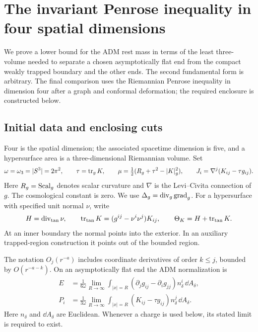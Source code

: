 \section{The invariant Penrose inequality in four spatial dimensions}
\label{four:sec:introduction}

We prove a lower bound for the ADM rest mass in terms of the least
three-volume needed to separate a chosen asymptotically flat end from
the compact weakly trapped boundary and the other ends. The second
fundamental form is arbitrary. The final comparison uses the
Riemannian Penrose inequality in dimension four after a graph and
conformal deformation; the required enclosure is constructed below.

\subsection{Initial data and enclosing cuts}

Four is the spatial dimension; the associated spacetime dimension is
five, and a hypersurface area is a three-dimensional Riemannian volume.
Set
\[
 \omega=\omega_3=|S^3|=2\pi^2,\qquad
 \tau=\operatorname{tr}_gK,\qquad
 \mu=\tfrac12(R_g+\tau^2-|K|_g^2),\qquad
 J_i=\nabla^j(K_{ij}-\tau g_{ij}).
\]
Here $R_g=\operatorname{Scal}_g$ denotes scalar curvature and $\nabla$ is the
Levi--Civita connection of $g$. The cosmological constant is zero. We use
\(\Delta_g=\operatorname{div}_g\operatorname{grad}_g\).
For a hypersurface with specified unit normal \(\nu\), write
\[
 H=\operatorname{div}_{\mathrm{tan}}\nu,\qquad
 \operatorname{tr}_{\mathrm{tan}}K=(g^{ij}-\nu^i\nu^j)K_{ij},\qquad
 \Theta_K=H+\operatorname{tr}_{\mathrm{tan}}K.
\]
At an inner boundary the normal points into the exterior. In an auxiliary
trapped-region construction it points out of the bounded region.

The notation \(O_j(r^{-a})\) includes coordinate derivatives of order
\(k\le j\), bounded by \(O(r^{-a-k})\). On an asymptotically flat end the
ADM normalization is
\begin{align}
 E&=\frac{1}{6\omega}\lim_{R\to\infty}
       \int_{|x|=R}(\partial_jg_{ij}-\partial_i g_{jj})
                    n_\delta^i\,\dd A_\delta,\label{four:intro:energy}\\
 P_i&=\frac{1}{3\omega}\lim_{R\to\infty}
       \int_{|x|=R}(K_{ij}-\tau g_{ij})
                    n_\delta^j\,\dd A_\delta.\label{four:intro:momentum}
\end{align}
Here \(n_\delta\) and \(\dd A_\delta\) are Euclidean.
Whenever a charge is used below, its stated limit is required to exist.

